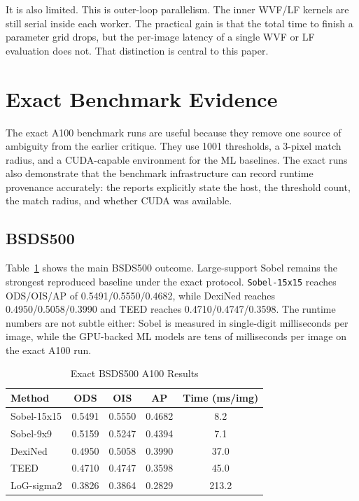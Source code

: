 \documentclass[conference]{IEEEtran}
\begin{document}
It is also limited. This is outer-loop parallelism. The inner WVF/LF kernels are still serial inside each worker. The practical gain is that the total time to finish a parameter grid drops, but the per-image latency of a single WVF or LF evaluation does not. That distinction is central to this paper.

\section{Exact Benchmark Evidence}
The exact A100 benchmark runs are useful because they remove one source of ambiguity from the earlier critique. They use 1001 thresholds, a 3-pixel match radius, and a CUDA-capable environment for the ML baselines. The exact runs also demonstrate that the benchmark infrastructure can record runtime provenance accurately: the reports explicitly state the host, the threshold count, the match radius, and whether CUDA was available.

\subsection{BSDS500}
Table~\ref{tab:bsds} shows the main BSDS500 outcome. Large-support Sobel remains the strongest reproduced baseline under the exact protocol. \texttt{Sobel-15x15} reaches ODS/OIS/AP of 0.5491/0.5550/0.4682, while DexiNed reaches 0.4950/0.5058/0.3990 and TEED reaches 0.4710/0.4747/0.3598. The runtime numbers are not subtle either: Sobel is measured in single-digit milliseconds per image, while the GPU-backed ML models are tens of milliseconds per image on the exact A100 run.

\begin{table}[t]
\centering
\caption{Exact BSDS500 A100 Results}
\label{tab:bsds}
\scriptsize
\begin{tabular}{lcccc}
\toprule
Method & ODS & OIS & AP & Time (ms/img) \\
\midrule
Sobel-15x15 & 0.5491 & 0.5550 & 0.4682 & 8.2 \\
Sobel-9x9 & 0.5159 & 0.5247 & 0.4394 & 7.1 \\
DexiNed & 0.4950 & 0.5058 & 0.3990 & 37.0 \\
TEED & 0.4710 & 0.4747 & 0.3598 & 45.0 \\
LoG-sigma2 & 0.3826 & 0.3864 & 0.2829 & 213.2 \\
\bottomrule
\end{tabular}
\end{table}
\end{document}
